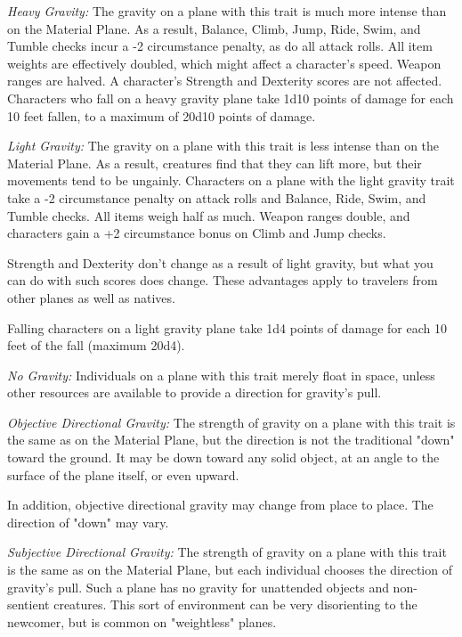 \textit{Heavy Gravity:} The gravity on a plane with this trait is much more intense 
than on the Material Plane. As a result, Balance, Climb, Jump, Ride, Swim, and 
Tumble checks incur a -2 circumstance penalty, as do all attack rolls. All item 
weights are effectively doubled, which might affect a character's speed. Weapon 
ranges are halved. A character's Strength and Dexterity scores are not affected. 
Characters who fall on a heavy gravity plane take 1d10 points of damage for each 
10 feet fallen, to a maximum of 20d10 points of damage.

\textit{Light Gravity:} The gravity on a plane with this trait is less intense 
than on the Material Plane. As a result, creatures find that they can lift more, 
but their movements tend to be ungainly. Characters on a plane with the light gravity 
trait take a -2 circumstance penalty on attack rolls and Balance, Ride, Swim, and 
Tumble checks. All items weigh half as much. Weapon ranges double, and characters 
gain a +2 circumstance bonus on Climb and Jump checks.

Strength and Dexterity don't change as a result of light gravity, but what you 
can do with such scores does change. These advantages apply to travelers from other 
planes as well as natives.

Falling characters on a light gravity plane take 1d4 points of damage for each 
10 feet of the fall (maximum 20d4).

\textit{No Gravity:} Individuals on a plane with this trait merely float in space, 
unless other resources are available to provide a direction for gravity's pull.

\textit{Objective Directional Gravity:} The strength of gravity on a plane with 
this trait is the same as on the Material Plane, but the direction is not the traditional 
"down" toward the ground. It may be down toward any solid object, at an angle 
to the surface of the plane itself, or even upward.

In addition, objective directional gravity may change from place to place. The 
direction of "down" may vary.

\textit{Subjective Directional Gravity:} The strength of gravity on a plane with 
this trait is the same as on the Material Plane, but each individual chooses the 
direction of gravity's pull. Such a plane has no gravity for unattended objects 
and non-sentient creatures. This sort of environment can be very disorienting to 
the newcomer, but is common on "weightless" planes.

